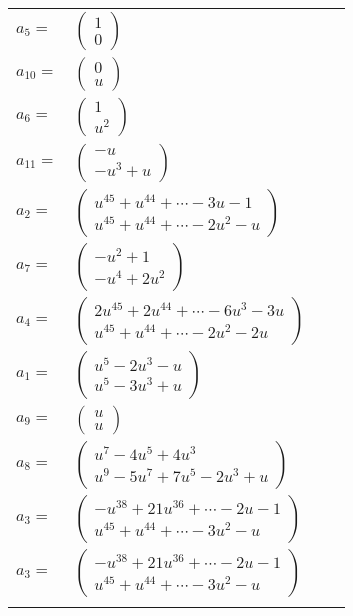 \documentclass[1p]{elsarticle_modified}
\theoremstyle{definition}
\begin{document}
\begin{tabular}{m{7pt} m{180pt} m{7pt} m{180pt} }
\flushright $a_{5}=$&$\begin{pmatrix}1\\0\end{pmatrix}$ \\
\flushright $a_{10}=$&$\begin{pmatrix}0\\u\end{pmatrix}$ \\
\flushright $a_{6}=$&$\begin{pmatrix}1\\u^2\end{pmatrix}$ \\
\flushright $a_{11}=$&$\begin{pmatrix}- u\\- u^3+u\end{pmatrix}$ \\
\flushright $a_{2}=$&$\begin{pmatrix}u^{45}+u^{44}+\cdots-3 u-1\\u^{45}+u^{44}+\cdots-2 u^2- u\end{pmatrix}$ \\
\flushright $a_{7}=$&$\begin{pmatrix}- u^2+1\\- u^4+2 u^2\end{pmatrix}$ \\
\flushright $a_{4}=$&$\begin{pmatrix}2 u^{45}+2 u^{44}+\cdots-6 u^3-3 u\\u^{45}+u^{44}+\cdots-2 u^2-2 u\end{pmatrix}$ \\
\flushright $a_{1}=$&$\begin{pmatrix}u^5-2 u^3- u\\u^5-3 u^3+u\end{pmatrix}$ \\
\flushright $a_{9}=$&$\begin{pmatrix}u\\u\end{pmatrix}$ \\
\flushright $a_{8}=$&$\begin{pmatrix}u^7-4 u^5+4 u^3\\u^9-5 u^7+7 u^5-2 u^3+u\end{pmatrix}$ \\
\flushright $a_{3}=$&$\begin{pmatrix}- u^{38}+21 u^{36}+\cdots-2 u-1\\u^{45}+u^{44}+\cdots-3 u^2- u\end{pmatrix}$\\ \flushright $a_{3}=$&$\begin{pmatrix}- u^{38}+21 u^{36}+\cdots-2 u-1\\u^{45}+u^{44}+\cdots-3 u^2- u\end{pmatrix}$\\&\end{tabular}
\end{document}

